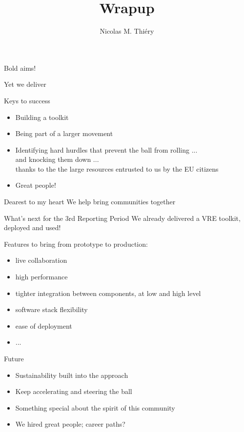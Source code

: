 \documentclass{beamer}
\author{Nicolas M. Thiéry}
\title{Wrapup}
\begin{document}
\begin{frame}
  \titlepage
\end{frame}

\begin{frame}{Bold aims!}
  \pause
  \begin{block}{Yet we deliver}
  \end{block}
  \pause
  \begin{block}{Keys to success}\pause
    \begin{itemize}
    \item Building a toolkit\pause
    \item Being part of a larger movement\pause
    \item Identifying hard hurdles that prevent the ball from rolling
      ...\\\pause
      and knocking them down ...\\\pause
      thanks to the the large resources entrusted to us by the EU
      citizens\pause\medskip
    \item Great people!
    \end{itemize}
  \end{block}
  \medskip\pause

  \begin{block}{Dearest to my heart}\pause
    We help bring communities together
  \end{block}
\end{frame}

\begin{frame}{What's next for the 3rd Reporting Period}
  We already delivered a VRE toolkit\pause, deployed and used!
  \bigskip\pause

  Features to bring from prototype to production:
  \begin{itemize}
  \item live collaboration
  \item high performance
  \item tighter integration between components, at low and high level
  \item software stack flexibility
  \item ease of deployment
  \item ...
  \end{itemize}
\end{frame}

\begin{frame}{Future}
  \begin{itemize}
  \item Sustainability built into the approach\bigskip\pause

  \item Keep accelerating and steering the ball\bigskip\pause
  \item Something special about the spirit of this community\bigskip\pause
  \item We hired great people\pause; career paths?
  \end{itemize}
\end{frame}
\end{document}
